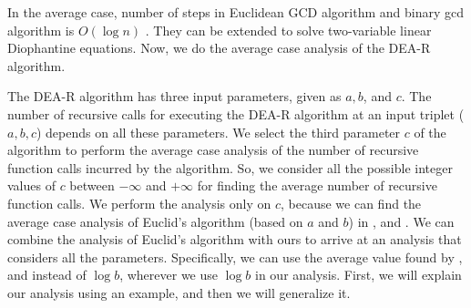 \documentclass[pdflatex,sn-mathphys-num]{sn-jnl}%
\theoremstyle{thmstyleone}%
\theoremstyle{thmstyletwo}%
\theoremstyle{thmstylethree}%
\begin{document}
In the average case, number of steps in Euclidean GCD algorithm and binary gcd algorithm is $O(\log n)$ \cite{knuth2014art}. They can be extended to solve two-variable linear Diophantine equations. Now, we do the average case analysis of the DEA-R algorithm. 
 \par The DEA-R algorithm has three input parameters, given as $a,b$, and $c$. 
The number of recursive calls for executing the DEA-R algorithm at an input triplet ($a,b,c$) depends on all these parameters. We select the third parameter $c$ of the algorithm to perform the average case analysis of the number of recursive function calls incurred by the algorithm.  So, we consider all the possible integer values of $c$ between $-\infty$ and  $+\infty$ for finding the average number of recursive function calls. We perform the analysis only on $c$, because we can find the average case analysis of Euclid's algorithm (based on $a$ and $b$) in \cite{dixon1970number}, \cite{heilbronn1969average} and \cite{hensley1994number}. We can combine the analysis of Euclid's algorithm with ours to arrive at an analysis that considers all the parameters. Specifically, we can use the average value found by \cite{dixon1970number}, \cite{heilbronn1969average} and \cite{hensley1994number} instead of $\log b$, wherever we use $\log b$ in our analysis. First, we will explain our analysis using an example, and then we will generalize it.  
\end{document}
